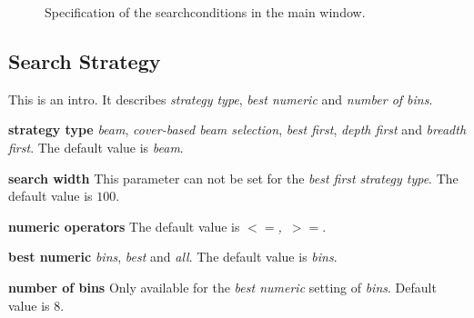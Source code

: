 \documentclass{article}
\begin{document}
\begin{figure}
\begin{center}
\centering
{}
\caption{Specification of the searchconditions in the main window.}
\end{center}
\label{fig:searchconditions}
\end{figure}



\subsection{Search Strategy}
\label{main:search-strategy}
This is an intro.
It describes \emph{strategy type}, \emph{best numeric} and \emph{number of bins}.

\textbf{strategy type} \emph{beam}, \emph{cover-based beam selection}, \emph{best first}, \emph{depth first} and \emph{breadth first}.
The default value is \emph{beam}.

\textbf{search width} This parameter can not be set for the \emph{best first} \emph{strategy type}.
The default value is \emph{$100$}.

\textbf{numeric operators} The default value is \mbox{\emph{$<=$, $>=$}}.

\textbf{best numeric} \emph{bins}, \emph{best} and \emph{all}.
The default value is \emph{bins}.

\textbf{number of bins} Only available for the \emph{best numeric} setting of \emph{bins}.
Default value is \emph{$8$}.
\end{document}
